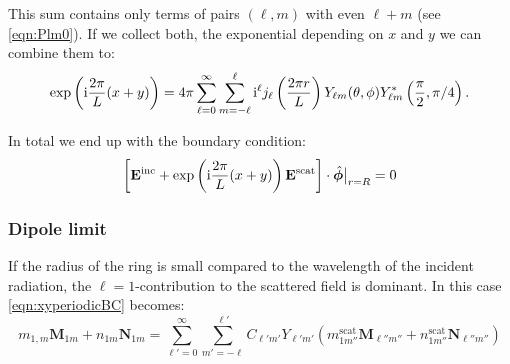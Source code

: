 This sum contains only terms of pairs $(\ell,m)$ with even $\ell+m$ (see \cref{eqn:Plm0}). If we collect both, the exponential depending on $x$ and $y$ we can combine them to:
\begin{equation}
\exp\left(\mathrm{i} \frac{2\pi}{L} (x+y)\right) = 4\pi \sum_{\ell=0}^\infty \sum_{m=-\ell}^\ell
\mathrm{i}^\ell j_\ell\left(\frac{2\pi r}{L}\right) Y_{\ell m}(\theta, \phi) Y_{\ell m}^*\left(\frac{\pi}{2}, \pi/4\right).
\end{equation}

In total we end up with the boundary condition:
\begin{equation}
\left[\mathbf{E}^\text{inc}+\exp\left(\mathrm{i} \frac{2\pi}{L}(x+y)\right)\mathbf{E}^\text{scat}\right] \cdot \hat{\bm{\phi}}\big|_{r=R} = 0
\label{eqn:xyperiodicBC}
\end{equation}

\subsubsection{Dipole limit}
If the radius of the ring is small compared to the wavelength of the incident radiation, the $\ell=1$-contribution to the scattered field is dominant.
In this case \cref{eqn:xyperiodicBC} becomes:
\begin{equation}
m_{1,m} \mathbf{M}_{1 m} + n_{1 m} \mathbf{N}_{1 m} = \sum_{\ell'=0}^\infty\sum_{m'=-\ell}^{\ell'}
C_{\ell' m'} Y_{\ell' m'} 
\left(
m^\text{scat}_{1 m''} \mathbf{M}_{\ell'' m''} +
n^\text{scat}_{1 m''} \mathbf{N}_{\ell'' m''}
\right)
\end{equation}